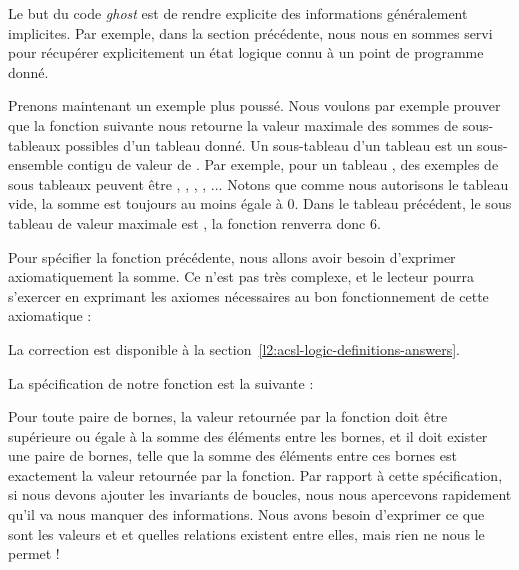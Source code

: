 

Le but du code \textit{ghost} est de rendre explicite des informations généralement
implicites. Par exemple, dans la section précédente, nous nous en sommes servi
pour récupérer explicitement un état logique connu à un point de programme
donné.



Prenons maintenant un exemple plus poussé. Nous voulons par exemple prouver que
la fonction suivante nous retourne la valeur maximale des sommes de sous-tableaux possibles d'un tableau donné. Un sous-tableau d'un tableau  est un
sous-ensemble contigu de valeur de . Par exemple, pour un tableau ,
des exemples de sous tableaux peuvent être \CodeInline{\{\}}, , 
, , ... Notons que comme nous autorisons le tableau vide,
la somme est toujours au moins égale à 0. Dans le tableau précédent, le sous
tableau de valeur maximale est , la fonction renverra donc 6.






Pour spécifier la fonction précédente, nous allons avoir besoin d'exprimer
axiomatiquement la somme. Ce n'est pas très complexe, et le lecteur pourra
s'exercer en exprimant les axiomes nécessaires au bon fonctionnement de cette
axiomatique :






La correction est disponible à la section~\ref{l2:acsl-logic-definitions-answers}.


La spécification de notre fonction est la suivante :






Pour toute paire de bornes, la valeur retournée par la fonction doit être
supérieure ou égale à la somme des éléments entre les bornes, et il doit exister
une paire de bornes, telle que la somme des éléments entre ces bornes est
exactement la valeur retournée par la fonction. Par rapport à cette spécification,
si nous devons ajouter les invariants de boucles, nous nous apercevons rapidement
qu'il va nous manquer des informations. Nous avons besoin d'exprimer ce que sont
les valeurs  et  et quelles relations existent entre elles,
mais rien ne nous le permet !



